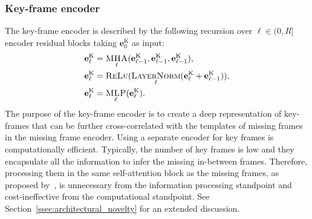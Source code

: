 \documentclass[letterpaper]{article} \usepackage[]{aaai23}  \usepackage{times}  \usepackage{helvet}  \usepackage{courier}  \usepackage[hyphens]{url}  \usepackage{graphicx} \urlstyle{rm} \def\UrlFont{\rm}  \usepackage{natbib}  \usepackage{caption} \frenchspacing  \setlength{\pdfpagewidth}{8.5in} \setlength{\pdfpageheight}{11in}
\renewcommand{\vec}[1]{\mathbf{#1}}
\DeclareMathOperator{\mha}{\textsc{MHA}}
\DeclareMathOperator{\mlp}{\textsc{MLP}}
\DeclareMathOperator{\relu}{\textsc{ReLu}}
\DeclareMathOperator{\layernorm}{\textsc{LayerNorm}}
\begin{document}
\subsubsection{Key-frame encoder} 
The key-frame encoder is described by the following recursion over $\ell \in (0, R]$ encoder residual blocks taking $\vec{e}_{0}^{\textrm{K}}$ as input:
\begin{align}
    \vec{e}_{\ell}^{\textrm{K}} &= \mha_{\ell}(\vec{e}_{\ell-1}^{\textrm{K}}, \vec{e}_{\ell-1}^{\textrm{K}}, \vec{e}_{\ell-1}^{\textrm{K}}), \nonumber \\
    \vec{e}_{\ell}^{\textrm{K}} &= \relu(\layernorm_{\ell}(\vec{e}_{\ell}^{\textrm{K}} + \vec{e}_{\ell-1}^{\textrm{K}})), \nonumber \\
    \vec{e}_{\ell}^{\textrm{K}} &= \mlp_{\ell}(\vec{e}_{\ell}^{\textrm{K}}). \nonumber 
\end{align}
The purpose of the key-frame encoder is to create a deep representation of key-frames that can be further cross-correlated with the templates of missing frames in the missing frame encoder. Using a separate encoder for key frames is computationally efficient. Typically, the number of key frames is low and they encapsulate all the information to infer the missing in-between frames. Therefore, processing them in the same self-attention block as the missing frames, as proposed by~\citet{duan2021singleshot}, is unnecessary from the information processing standpoint and cost-ineffective from the computational standpoint. See Section~\ref{ssec:architectural_novelty} for an extended discussion.
\end{document}
